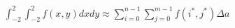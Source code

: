 \documentclass[preview]{standalone}
\begin{document}
\begin{align*}
\int_{-2}^2 \int_{-2}^2 f(x,y) dx dy \approx \sum_{i=0}^{n-1} \sum_{j=0}^{m-1} f(i^*,j^*) \Delta a
\end{align*}
\end{document}
